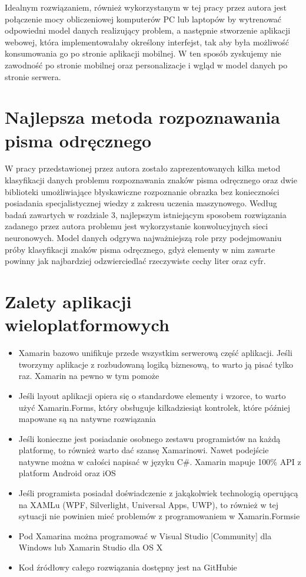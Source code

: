 \documentclass[brudnopis]{xmgr}
\begin{document}
Idealnym rozwiązaniem, również wykorzystanym w tej pracy przez autora jest połączenie mocy obliczeniowej komputerów PC lub laptopów by wytrenować odpowiedni model danych realizujący problem, a następnie stworzenie aplikacji webowej, która implementowałaby określony interfejst, tak aby była możliwość konsumowania go po stronie aplikacji mobilnej. W ten sposób zyskujemy nie zawodność po stronie mobilnej oraz personalizacje i wgląd w model danych po stronie serwera.

\section{Najlepsza metoda rozpoznawania pisma odręcznego}

W pracy przedstawionej przez autora zostało zaprezentowanych kilka metod klasyfikacji
danych problemu rozpoznawania znaków pisma odręcznego oraz dwie
biblioteki umożliwiające błyskawiczne rozpoznanie obrazka bez konieczności posiadania
specjalistycznej wiedzy z zakresu uczenia maszynowego.
Według badań zawartych w rozdziale 3, najlepszym istniejącym sposobem rozwiązania
zadanego przez autora problemu jest wykorzystanie konwolucyjnych sieci
neuronowych. Model danych odgrywa najważniejszą role przy podejmowaniu
próby klasyfikacji znaków pisma odręcznego, gdyż elementy w nim zawarte powinny
jak najbardziej odzwierciedlać rzeczywiste cechy liter oraz cyfr.

\section{Zalety aplikacji wieloplatformowych}

\begin{itemize}
\item
Xamarin bazowo unifikuje przede wszystkim serwerową część aplikacji. Jeśli tworzymy aplikacje z rozbudowaną logiką biznesową, to warto ją pisać tylko raz. Xamarin na pewno w tym pomoże
\item
Jeśli layout aplikacji opiera się o standardowe elementy i wzorce, to warto użyć Xamarin.Forms, który obsługuje kilkadziesiąt kontrolek, które później mapowane są na natywne rozwiązania
\item
Jeśli konieczne jest posiadanie osobnego zestawu programistów na każdą platformę, to również warto dać szansę Xamarinowi. Nawet podejście natywne można w całości napisać w języku C\#. Xamarin mapuje 100\% API z platform Android oraz iOS
\item
Jeśli programista posiadał doświadczenie z jakąkolwiek technologią operującą na XAMLu (WPF, Silverlight, Universal Apps, UWP), to również w tej sytuacji nie powinien mieć problemów z programowaniem w Xamarin.Formsie
\item
Pod Xamarina można programować w Visual Studio [Community] dla Windows lub Xamarin Studio dla OS X
\item
Kod źródłowy całego rozwiązania dostępny jest na GitHubie
\end{itemize}
\end{document}
